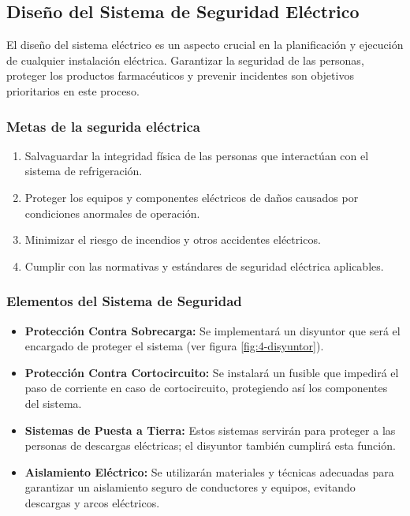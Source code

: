 
 \subsection{Diseño del Sistema de Seguridad Eléctrico}
 
 El diseño del sistema eléctrico es un aspecto crucial en la planificación y ejecución de cualquier instalación eléctrica. Garantizar la seguridad de las personas, proteger los productos farmacéuticos y prevenir incidentes son objetivos prioritarios en este proceso.
 
 \subsubsection{Metas de la segurida eléctrica}
 \begin{enumerate}
 	\item Salvaguardar la integridad física de las personas que interactúan con el sistema de refrigeración.
 	\item Proteger los equipos y componentes eléctricos de daños causados por condiciones anormales de operación.
 	\item Minimizar el riesgo de incendios y otros accidentes eléctricos.
 	\item Cumplir con las normativas y estándares de seguridad eléctrica aplicables.
 \end{enumerate}
 
 \subsubsection{Elementos del Sistema de Seguridad}
 \begin{itemize}
 	\item \textbf{Protección Contra Sobrecarga:} Se implementará un disyuntor que será el encargado de proteger el sistema (ver figura \ref{fig:4-disyuntor}).
 	\item \textbf{Protección Contra Cortocircuito:} Se instalará un fusible que impedirá el paso de corriente en caso de cortocircuito, protegiendo así los componentes del sistema.
 	\item \textbf{Sistemas de Puesta a Tierra:} Estos sistemas servirán para proteger a las personas de descargas eléctricas; el disyuntor también cumplirá esta función.
 	\item \textbf{Aislamiento Eléctrico:} Se utilizarán materiales y técnicas adecuadas para garantizar un aislamiento seguro de conductores y equipos, evitando descargas y arcos eléctricos.
 \end{itemize}
 
